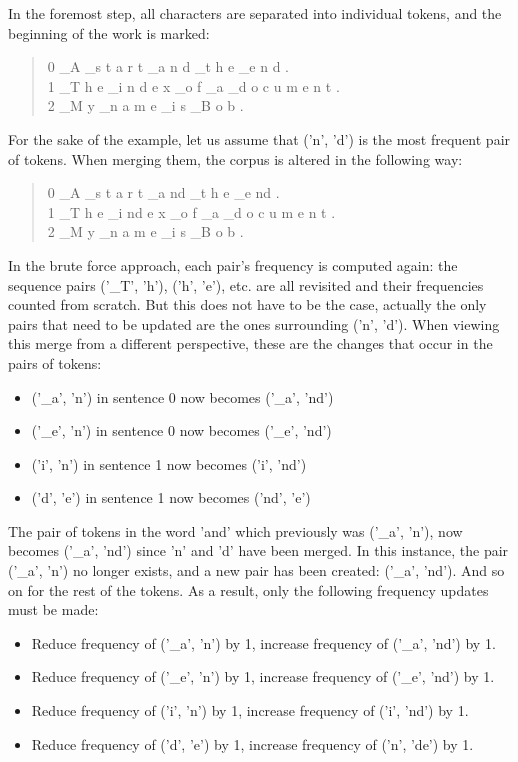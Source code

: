 In the foremost step, all characters are separated into individual tokens, and the beginning of the work is marked:

\begin{quote}
	0	\_A \_s t a r t \_a n d \_t h e \_e n d .\\
	1 	\_T h e \_i n d e x \_o f \_a \_d o c u m e n t .\\
	2 	\_M y \_n a m e \_i s \_B o b .
\end{quote}

For the sake of the example, let us assume that ('n', 'd') is the most frequent pair of tokens. When merging them, the corpus is altered in the following way:

\begin{quote}
	0	\_A \_s t a r t \_a nd \_t h e \_e nd .\\
	1 	\_T h e \_i nd e x \_o f \_a \_d o c u m e n t .\\
	2 	\_M y \_n a m e \_i s \_B o b .
\end{quote}

In the brute force approach, each pair's frequency is computed again: the sequence pairs ('\_T', 'h'), ('h', 'e'), etc. are all revisited and their frequencies counted from scratch. But this does not have to be the case, actually the only pairs that need to be updated are the ones surrounding ('n', 'd'). When viewing this merge from a different perspective, these are the changes that occur in the pairs of tokens:

\begin{itemize}
	\item ('\_a', 'n') in sentence 0 now becomes ('\_a', 'nd')
	\item ('\_e', 'n') in sentence 0 now becomes ('\_e', 'nd')
	\item ('i', 'n') in sentence 1 now becomes ('i', 'nd')
	\item ('d', 'e') in sentence 1 now becomes ('nd', 'e')
\end{itemize}

The pair of tokens in the word 'and' which previously was ('\_a', 'n'), now becomes ('\_a', 'nd') since 'n' and 'd' have been merged. In this instance, the pair ('\_a', 'n') no longer exists, and a new pair has been created: ('\_a', 'nd'). And so on for the rest of the tokens. As a result, only the following frequency updates must be made:

\begin{itemize}
	\item Reduce frequency of ('\_a', 'n') by 1, increase frequency of ('\_a', 'nd') by 1.
	\item Reduce frequency of ('\_e', 'n') by 1, increase frequency of ('\_e', 'nd') by 1.
	\item Reduce frequency of ('i', 'n') by 1, increase frequency of ('i', 'nd') by 1.
	\item Reduce frequency of ('d', 'e') by 1, increase frequency of ('n', 'de') by 1.
\end{itemize}

